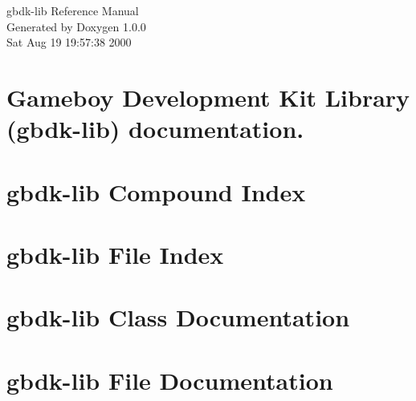 \documentclass[a4paper]{book}
\begin{document}
\begin{titlepage}
\vspace*{7cm}
\begin{center}
{\Large gbdk-lib Reference Manual}\\
\vspace*{1cm}
{\large Generated by Doxygen 1.0.0}\\
\vspace*{0.5cm}
{\small Sat Aug 19 19:57:38 2000}\\
\end{center}
\end{titlepage}
\clearemptydoublepage
{}
\tableofcontents
\clearemptydoublepage
{}
\chapter{Gameboy Development Kit Library (gbdk-lib) documentation.}

\chapter{gbdk-lib Compound Index}

\chapter{gbdk-lib File Index}

\chapter{gbdk-lib Class Documentation}

\chapter{gbdk-lib File Documentation}
















\printindex
\end{document}

